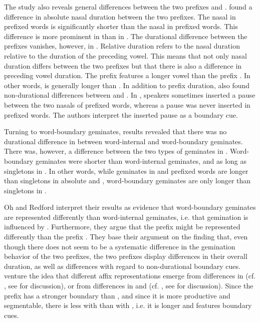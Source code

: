 The study also reveals general differences between the two prefixes  and . \cite{Oh.2012} found a difference in absolute nasal duration between the two prefixes. The nasal in prefixed words is significantly shorter than the nasal in prefixed words. This difference is more prominent in  than in . The durational difference between the prefixes vanishes, however, in . Relative duration refers to the nasal duration relative to the duration of the preceding vowel. This means that not only nasal duration differs between the two prefixes but that there is also a difference in preceding vowel duration. The prefix  features a longer vowel than the prefix .  In other words,  is generally longer than . In addition to prefix duration, \cite{Oh.2012}
also found non-durational differences between  and . In , speakers sometimes inserted a pause between the two nasals of prefixed words, whereas a pause was never inserted in prefixed words. The authors interpret the inserted pause as a boundary cue.

Turning to word-boundary geminates,  results revealed that there was no durational difference in  between word-internal and word-boundary geminates. There was, however, a difference between the two types of geminates in . Word-boundary geminates were shorter than word-internal geminates, and as long as singletons in . In other words, while geminates in  and prefixed words are longer than singletons in absolute and , word-boundary geminates are only longer than singletons in .


Oh and Redford interpret their results as evidence that word-boundary geminates are represented differently than word-internal geminates, i.e. that gemination is influenced by .  Furthermore, they argue that the prefix  might be represented differently than the prefix . They base their argument on the finding that, even though there does not seem to be a systematic difference in the gemination behavior of the two prefixes, the two prefixes display differences in their overall duration, as well as differences with regard to non-durational boundary cues. \cite{Oh.2012} venture the idea that different affix representations emerge from differences in  (cf. \citealt{Kiparsky.1982,Mohanan.1986}, see  for discussion), or from differences in  and  (cf. \citealt{Hay.2003}, see  for discussion). Since the prefix  has a stronger boundary than , and since it is more productive and segmentable, there is less  with  than with , i.e. it is longer and features boundary cues.


